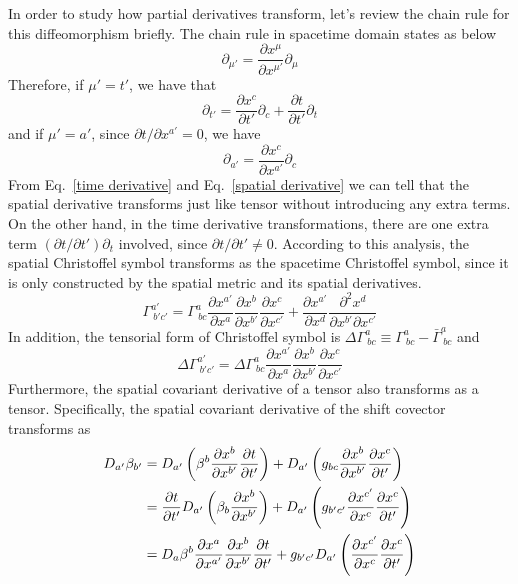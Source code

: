 \documentclass[letterpaper,nofootinbib,prd,amsmath,onecolumn]{revtex4-1}
\begin{document}
In order to study how partial derivatives transform, let's review the chain rule for this diffeomorphism briefly. The chain rule in spacetime domain states as below
\begin{equation*}
\partial_{\mu'} = \frac{\partial x^{\mu}}{\partial x^{\mu'}}\partial_{\mu}
\end{equation*}
Therefore, if $\mu' = t'$, we have that
\begin{equation}\label{time derivative}
\partial_{t'} = \frac{\partial x^{c}}{\partial t'}\partial_{c} + \frac{\partial t}{\partial t'}\partial_{t}
\end{equation}
and if $\mu' = a'$, since $\partial t/\partial x^{a'} = 0$, we have
\begin{equation}\label{spatial derivative}
\partial_{a'} = \frac{\partial x^{c}}{\partial x^{a'}}\partial_{c}
\end{equation}
From Eq.~\ref{time derivative} and Eq.~\ref{spatial derivative} we can tell that the spatial derivative transforms just like tensor without introducing any extra terms. On the other hand, in the time derivative transformations, there are one extra term $(\partial t/\partial t')\partial_{t}$ involved, since $\partial t/\partial t' \ne 0$. According to this analysis, the spatial Christoffel symbol transforms as the spacetime Christoffel symbol, since it is only constructed by the spatial metric and its spatial derivatives. 
\begin{equation}
\Gamma^{a'}_{~b'c'} = \Gamma^{a}_{~bc}\frac{\partial x^{a'}}{\partial x^{a}}\frac{\partial x^{b}}{\partial x^{b'}}\frac{\partial x^{c}}{\partial x^{c'}} + \frac{\partial x^{a'}}{\partial x^{d}}\frac{\partial^{2} x^{d}}{\partial x^{b'}\partial x^{c'}}
\end{equation}
In addition, the tensorial form of Christoffel symbol is $\Delta \Gamma^{a}_{~bc} \equiv \Gamma^{a}_{~bc} - {\bar \Gamma}^{a}_{~bc}$ and
\begin{equation}
\Delta \Gamma^{a'}_{~b'c'} = \Delta \Gamma^{a}_{~bc}\frac{\partial x^{a'}}{\partial x^{a}}\frac{\partial x^{b}}{\partial x^{b'}}\frac{\partial x^{c}}{\partial x^{c'}}
\end{equation}
Furthermore, the spatial covariant derivative of a tensor also transforms as a tensor. Specifically, the spatial covariant derivative of the shift covector transforms as
\begin{align}
D_{a'}\beta_{b'} &= D_{a'}\left(\beta^{b}\frac{\partial x^{b}}{\partial x^{b'}}\frac{\partial t}{\partial t'}\right) + D_{a'}\left(g_{bc}\frac{\partial x^{b}}{\partial x^{b'}}\frac{\partial x^{c}}{\partial t'}\right)\notag\\
& = \frac{\partial t}{\partial t'}D_{a'}\left(\beta_{b}\frac{\partial x^{b}}{\partial x^{b'}}\right) + D_{a'}\left(g_{b'c'}\frac{\partial x^{c'}}{\partial x^{c}}\frac{\partial x^{c}}{\partial t'}\right)\notag\\
& = D_{a}\beta^{b}\frac{\partial x^{a}}{\partial x^{a'}}\frac{\partial x^{b}}{\partial x^{b'}}\frac{\partial t}{\partial t'} + g_{b'c'}D_{a'}\left(\frac{\partial x^{c'}}{\partial x^{c}}\frac{\partial x^{c}}{\partial t'}\right)
\end{align} 
\end{document}
